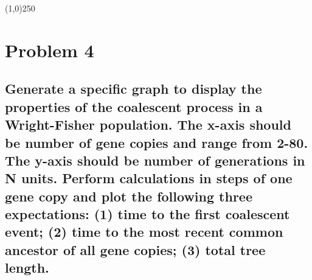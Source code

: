 \documentclass[]{article}
\begin{document}
\begin{center}
\line(1,0){250}
\end{center}

\pagebreak

\section{Problem 4}\label{problem-4}

\subsection{Generate a specific graph to display the properties of the
coalescent process in a Wright-Fisher population. The x-axis should be
number of gene copies and range from 2-80. The y-axis should be number
of generations in N units. Perform calculations in steps of one gene
copy and plot the following three expectations: (1) time to the first
coalescent event; (2) time to the most recent common ancestor of all
gene copies; (3) total tree
length.}\label{generate-a-specific-graph-to-display-the-properties-of-the-coalescent-process-in-a-wright-fisher-population.-the-x-axis-should-be-number-of-gene-copies-and-range-from-2-80.-the-y-axis-should-be-number-of-generations-in-n-units.-perform-calculations-in-steps-of-one-gene-copy-and-plot-the-following-three-expectations-1-time-to-the-first-coalescent-event-2-time-to-the-most-recent-common-ancestor-of-all-gene-copies-3-total-tree-length.}
\end{document}
